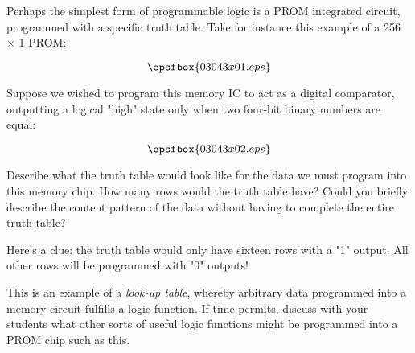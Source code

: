 

Perhaps the simplest form of programmable logic is a PROM integrated circuit, programmed with a specific truth table.  Take for instance this example of a 256 $\times$ 1 PROM:

$$\epsfbox{03043x01.eps}$$

Suppose we wished to program this memory IC to act as a digital comparator, outputting a logical "high" state only when two four-bit binary numbers are equal:

$$\epsfbox{03043x02.eps}$$

Describe what the truth table would look like for the data we must program into this memory chip.  How many rows would the truth table have?  Could you briefly describe the content pattern of the data without having to complete the entire truth table?







Here's a clue: the truth table would only have sixteen rows with a "1" output.  All other rows will be programmed with "0" outputs!







This is an example of a {\it look-up table}, whereby arbitrary data programmed into a memory circuit fulfills a logic function.  If time permits, discuss with your students what other sorts of useful logic functions might be programmed into a PROM chip such as this.





